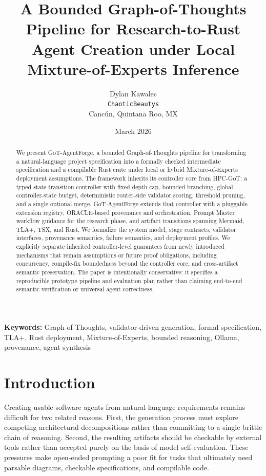 \documentclass[11pt,a4paper,oneside]{article}
\title{A Bounded Graph-of-Thoughts Pipeline for Research-to-Rust Agent Creation under Local Mixture-of-Experts Inference}
\author{Dylan Kawalec \\
        \texttt{ChaoticBeautys} \\
        Canc\'un, Quintana Roo, MX}
\date{March 2026}
\begin{document}
\maketitle

\begin{abstract}
We present GoT-AgentForge, a bounded Graph-of-Thoughts pipeline for transforming a natural-language project specification into a formally checked intermediate specification and a compilable Rust crate under local or hybrid Mixture-of-Experts deployment assumptions. The framework inherits its controller core from HPC-GoT: a typed state-transition controller with fixed depth cap, bounded branching, global controller-state budget, deterministic router-side validator scoring, threshold pruning, and a single optional merge. GoT-AgentForge extends that controller with a pluggable extension registry, ORACLE-based provenance and orchestration, Prompt Master workflow guidance for the research phase, and artifact transitions spanning Mermaid, TLA+, TSX, and Rust. We formalize the system model, stage contracts, validator interfaces, provenance semantics, failure semantics, and deployment profiles. We explicitly separate inherited controller-level guarantees from newly introduced mechanisms that remain assumptions or future proof obligations, including concurrency, compile-fix boundedness beyond the controller core, and cross-artifact semantic preservation. The paper is intentionally conservative: it specifies a reproducible prototype pipeline and evaluation plan rather than claiming end-to-end semantic verification or universal agent correctness.
\end{abstract}

\textbf{Keywords:} Graph-of-Thoughts, validator-driven generation, formal specification, TLA+, Rust deployment, Mixture-of-Experts, bounded reasoning, Ollama, provenance, agent synthesis

\section{Introduction}
Creating usable software agents from natural-language requirements remains difficult for two related reasons. First, the generation process must explore competing architectural decompositions rather than committing to a single brittle chain of reasoning. Second, the resulting artifacts should be checkable by external tools rather than accepted purely on the basis of model self-evaluation. These pressures make open-ended prompting a poor fit for tasks that ultimately need parsable diagrams, checkable specifications, and compilable code.
\end{document}
